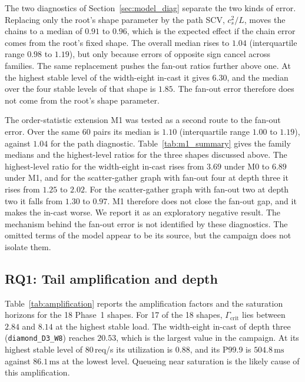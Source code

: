 The two diagnostics of Section~\ref{sec:model_diag} separate the two kinds of error. Replacing only the root's shape parameter by the path SCV, $c_s^2/L$, moves the chains to a median of $0.91$ to $0.96$, which is the expected effect if the chain error comes from the root's fixed shape. The overall median rises to $1.04$ (interquartile range $0.98$ to $1.19$), but only because errors of opposite sign cancel across families. The same replacement pushes the fan-out ratios further above one. At the highest stable level of the width-eight in-cast it gives $6.30$, and the median over the four stable levels of that shape is $1.85$. The fan-out error therefore does not come from the root's shape parameter.

The order-statistic extension M1 was tested as a second route to the fan-out error. Over the same 60 pairs its median is $1.10$ (interquartile range $1.00$ to $1.19$), against $1.04$ for the path diagnostic. Table~\ref{tab:m1_summary} gives the family medians and the highest-level ratios for the three shapes discussed above. The highest-level ratio for the width-eight in-cast rises from $3.69$ under M0 to $6.89$ under M1, and for the scatter-gather graph with fan-out four at depth three it rises from $1.25$ to $2.02$. For the scatter-gather graph with fan-out two at depth two it falls from $1.30$ to $0.97$. M1 therefore does not close the fan-out gap, and it makes the in-cast worse. We report it as an exploratory negative result. The mechanism behind the fan-out error is not identified by these diagnostics. The omitted terms of the model appear to be its source, but the campaign does not isolate them.



\subsection{RQ1: Tail amplification and depth}
\label{sec:rq1}

Table~\ref{tab:amplification} reports the amplification factors and the saturation horizons for the 18 Phase~1 shapes. For 17 of the 18 shapes, $\Gamma_{\mathrm{crit}}$ lies between $2.84$ and $8.14$ at the highest stable load. The width-eight in-cast of depth three (\texttt{diamond\_D3\_W8}) reaches $20.53$, which is the largest value in the campaign. At its highest stable level of $80$\,req/s its utilization is $0.88$, and its P99.9 is $504.8\,\mathrm{ms}$ against $86.1\,\mathrm{ms}$ at the lowest level. Queueing near saturation is the likely cause of this amplification.

